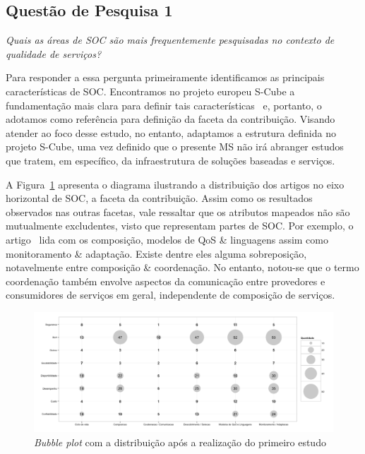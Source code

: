 \subsection{Quest\~{a}o de Pesquisa 1}
\emph{Quais as áreas de SOC são mais frequentemente pesquisadas no contexto de qualidade de serviços?}


Para responder a essa pergunta primeiramente identificamos as principais caracter\'{i}sticas de SOC. Encontramos no projeto europeu S-Cube a fundamenta\c{c}\~{a}o mais clara para definir tais caracter\'{i}sticas~\cite{SCube-FINALREPORT} e, portanto, o adotamos como refer\^{e}ncia para definição da faceta da contribui\c{c}\~{a}o. Visando atender ao foco desse estudo, no entanto, adaptamos a estrutura definida no projeto S-Cube, uma vez definido que o presente MS não irá abranger estudos que tratem, em específico, da infraestrutura de soluções baseadas e serviços.


A Figura~\ref{fig:bubbleplot-QoSSOC} apresenta o diagrama ilustrando a distribui\c{c}\~{a}o dos artigos no eixo horizontal de SOC, a faceta da contribui\c{c}\~{a}o. Assim como os resultados observados nas outras facetas, vale ressaltar que os atributos mapeados não são mutualmente excludentes, visto que representam partes de SOC. Por exemplo, o artigo~\cite{DBLP:conf/dsn/ZhengL09} lida com os composi\c{c}\~{a}o, modelos de QoS \& linguagens assim como monitoramento \& adapta\c{c}\~{a}o. Existe dentre eles alguma sobreposição, notavelmente entre composição \& coordenação. No entanto, notou-se que o termo coordenação também envolve aspectos da comunicação entre provedores e consumidores de serviços em geral, independente de composição de serviços. 

\begin{figure}[htb]
\centering
\includegraphics[scale=0.4]{imagens/contribuicaoContexto.pdf}
\caption{\emph{Bubble plot} com a distribui\c{c}\~{a}o ap\'{o}s a realiza\c{c}\~{a}o do primeiro  estudo}
\label{fig:bubbleplot-QoSSOC}
\end{figure}

